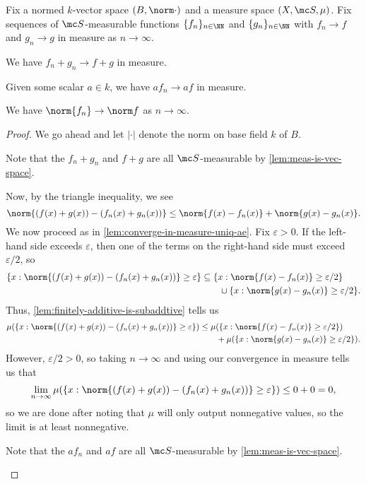 \documentclass[../notes.tex]{subfiles}
\begin{document}
\begin{lemma} \label{lem:linear-combo-in-measure}
	Fix a normed $k$-vector space $(B,\norm\cdot)$ and a measure space $(X,\mc S,\mu)$. Fix sequences of $\mc S$-measurable functions $\{f_n\}_{n\in\NN}$ and $\{g_n\}_{n\in\NN}$ with $f_n\to f$ and $g_n\to g$ in measure as $n\to\infty$.
	\begin{listalph}
		\item We have $f_n+g_n\to f+g$ in measure.
		\item Given some scalar $a\in k$, we have $af_n\to af$ in measure.
		\item We have $\norm{f_n}\to\norm f$ as $n\to\infty$.
	\end{listalph}
\end{lemma}
\begin{proof}
	We go ahead and let $|\cdot|$ denote the norm on base field $k$ of $B$.
	\begin{listalph}
		\item Note that the $f_n+g_n$ and $f+g$ are all $\mc S$-measurable by \autoref{lem:meas-is-vec-space}.
		
		Now, by the triangle inequality, we see
		\[\norm{(f(x)+g(x))-(f_n(x)+g_n(x))}\le\norm{f(x)-f_n(x)}+\norm{g(x)-g_n(x)}.\]
		We now proceed as in \autoref{lem:converge-in-measure-uniq-ae}. Fix $\varepsilon>0$. If the left-hand side exceeds $\varepsilon$, then one of the terms on the right-hand side must exceed $\varepsilon/2$, so
		\begin{align*}
			\{x:\norm{(f(x)+g(x))-(f_n(x)+g_n(x))}\ge\varepsilon\}&\subseteq\{x:\norm{f(x)-f_n(x)}\ge\varepsilon/2\} \\
			&\qquad\cup\{x:\norm{g(x)-g_n(x)}\ge\varepsilon/2\}.
		\end{align*}
		Thus, \autoref{lem:finitely-additive-is-subaddtive} tells us
		\begin{align*}
			\mu(\{x:\norm{(f(x)+g(x))-(f_n(x)+g_n(x))}\ge\varepsilon\}) &\le \mu(\{x:\norm{f(x)-f_n(x)}\ge\varepsilon/2\}) \\
			&\qquad+\mu(\{x:\norm{g(x)-g_n(x)}\ge\varepsilon/2\}).
		\end{align*}
		However, $\varepsilon/2>0$, so taking $n\to\infty$ and using our convergence in measure tells us that
		\[\lim_{n\to\infty}\mu(\{x:\norm{(f(x)+g(x))-(f_n(x)+g_n(x))}\ge\varepsilon\})\le0+0=0,\]
		so we are done after noting that $\mu$ will only output nonnegative values, so the limit is at least nonnegative.

		\item Note that the $af_n$ and $af$ are all $\mc S$-measurable by \autoref{lem:meas-is-vec-space}.
		

\end{listalph}
\end{proof}
\end{document}
